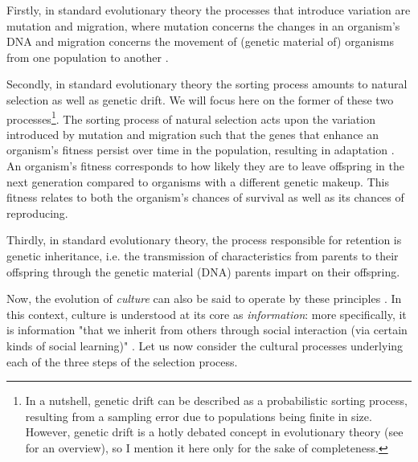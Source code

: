 Firstly, in standard evolutionary theory the processes that introduce variation are mutation and migration, where mutation concerns the changes in an organism's DNA and migration concerns the movement of (genetic material of) organisms from one population to another \citep{S-P13}.

Secondly, in standard evolutionary theory the sorting process amounts to natural selection as well as genetic drift. We will focus here on the former of these two processes\footnote{In a nutshell, genetic drift can be described as a probabilistic sorting process, resulting from a sampling error due to populations being finite in size. However, genetic drift is a hotly debated concept in evolutionary theory (see \citet{Millstein21} for an overview), so I mention it here only for the sake of completeness.}.
The sorting process of natural selection 
acts upon the variation introduced by mutation and migration such that the genes that enhance an organism's fitness persist over time in the population, resulting in adaptation \citep{S-P13}. An organism's fitness corresponds to how likely they are to leave offspring in the next generation compared to organisms with a different genetic makeup. This fitness relates to both the organism's chances of survival as well as its chances of reproducing.

Thirdly, in standard evolutionary theory, the process responsible for retention is genetic inheritance, i.e. the transmission of characteristics from parents to their offspring through the genetic material (DNA) parents impart on their offspring.

Now, the evolution of \emph{culture} can also be said to operate by these principles \citep{Heyes18}. In this context, culture is understood at its core as \emph{information}: more specifically, it is information "that we inherit from others through social interaction (via certain kinds of social learning)" \citep[p.~30]{Heyes18}.
Let us now consider the cultural processes underlying each of the three steps of the selection process.

